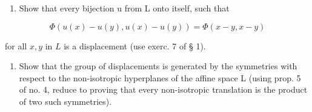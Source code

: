 \begin{enumerate}
\def\labelenumi{\alph{enumi})}
\tightlist
\item
  Show that every bijection u from L onto itself, such that
\end{enumerate}

\[
\Phi (u (x) - u (y), u (x) - u (y)) = \Phi (x - y, x - y)
\]

for all \(x, y\) in \(L\) is a displacement (use exerc. 7 of § 1).

\begin{enumerate}
\def\labelenumi{\alph{enumi})}
\setcounter{enumi}{1}
\tightlist
\item
  Show that the group of displacements is generated by the symmetries with respect to the non-isotropic hyperplanes of the affine space L (using prop. 5 of no. 4, reduce to proving that every non-isotropic translation is the product of two such symmetries).
\end{enumerate}


